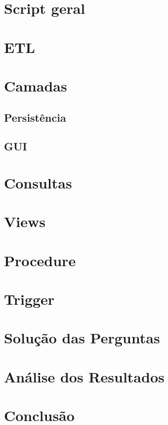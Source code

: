 \documentclass[12pt]{article}
\begin{document}
	\section{Script geral}
	\label{sec:scriptg}
	
	\section{ETL}
	\label{sec:etl}
	
	\section{Camadas}
	\label{sec:camadas}
	
	\subsection{Persistência}
	\label{sec:pers}
	
	\subsection{GUI}
	\label{sec:gui}
	
	\section{Consultas} 
	\label{sec:consultas}
	
	\section{Views}
	\label{sec:views}
	
	\section{Procedure}
	\label{sec:procedure}
	
	\section{Trigger}
	\label{sec:trigger}
	
	\section{Solução das Perguntas}
	\label{sec:analisep}
	
	\section{Análise dos Resultados}
	\label{sec:resultados}
	
	\section{Conclusão}
	\label{sec:conclusao}
	
%
% 

	
\end{document}
